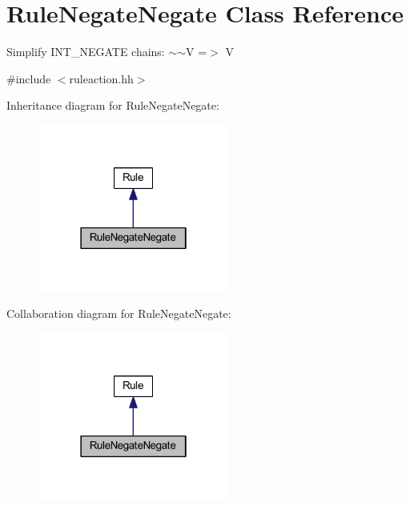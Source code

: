 \hypertarget{class_rule_negate_negate}{}\section{Rule\+Negate\+Negate Class Reference}
\label{class_rule_negate_negate}


Simplify I\+N\+T\+\_\+\+N\+E\+G\+A\+TE chains\+: {\ttfamily $\sim$$\sim$V =$>$ V}  




{\ttfamily \#include $<$ruleaction.\+hh$>$}



Inheritance diagram for Rule\+Negate\+Negate\+:
\nopagebreak
\begin{figure}[H]
\begin{center}
\leavevmode
\includegraphics[width=178pt]{class_rule_negate_negate__inherit__graph}
\end{center}
\end{figure}


Collaboration diagram for Rule\+Negate\+Negate\+:
\nopagebreak
\begin{figure}[H]
\begin{center}
\leavevmode
\includegraphics[width=178pt]{class_rule_negate_negate__coll__graph}
\end{center}
\end{figure}
